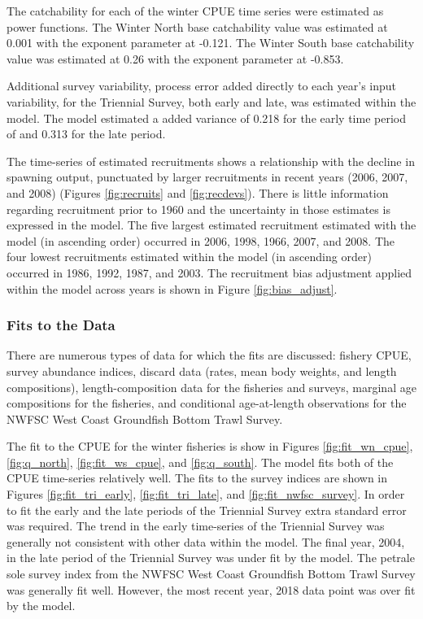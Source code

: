 \documentclass[12pt,]{article}
\begin{document}
The catchability for each of the winter CPUE time series were estimated
as power functions. The Winter North base catchability value was
estimated at 0.001 with the exponent parameter at -0.121. The Winter
South base catchability value was estimated at 0.26 with the exponent
parameter at -0.853.

Additional survey variability, process error added directly to each
year's input variability, for the Triennial Survey, both early and late,
was estimated within the model. The model estimated a added variance of
0.218 for the early time period of and 0.313 for the late period.

The time-series of estimated recruitments shows a relationship with the
decline in spawning output, punctuated by larger recruitments in recent
years (2006, 2007, and 2008) (Figures \ref{fig:recruits} and
\ref{fig:recdevs}). There is little information regarding recruitment
prior to 1960 and the uncertainty in those estimates is expressed in the
model. The five largest estimated recruitment estimated with the model
(in ascending order) occurred in 2006, 1998, 1966, 2007, and 2008. The
four lowest recruitments estimated within the model (in ascending order)
occurred in 1986, 1992, 1987, and 2003. The recruitment bias adjustment
applied within the model across years is shown in Figure
\ref{fig:bias_adjust}.

\subsubsection{Fits to the Data}\label{fits-to-the-data}

There are numerous types of data for which the fits are discussed:
fishery CPUE, survey abundance indices, discard data (rates, mean body
weights, and length compositions), length-composition data for the
fisheries and surveys, marginal age compositions for the fisheries, and
conditional age-at-length observations for the NWFSC West Coast
Groundfish Bottom Trawl Survey.

The fit to the CPUE for the winter fisheries is show in Figures
\ref{fig:fit_wn_cpue}, \ref{fig:q_north}, \ref{fig:fit_ws_cpue}, and
\ref{fig:q_south}. The model fits both of the CPUE time-series
relatively well. The fits to the survey indices are shown in Figures
\ref{fig:fit_tri_early}, \ref{fig:fit_tri_late}, and
\ref{fig:fit_nwfsc_survey}. In order to fit the early and the late
periods of the Triennial Survey extra standard error was required. The
trend in the early time-series of the Triennial Survey was generally not
consistent with other data within the model. The final year, 2004, in
the late period of the Triennial Survey was under fit by the model. The
petrale sole survey index from the NWFSC West Coast Groundfish Bottom
Trawl Survey was generally fit well. However, the most recent year, 2018
data point was over fit by the model.
\end{document}
